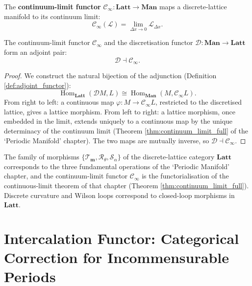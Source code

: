 \begin{definition}\label{def:continuum_limit_functor}
The \textbf{continuum-limit functor} $\mathcal{C}_{\infty}: \mathbf{Latt} \to \mathbf{Man}$ maps a discrete-lattice manifold to its continuum limit:
\[
\mathcal{C}_{\infty}(\mathcal{L}) = \lim_{\Delta x \to 0} \mathcal{L}_{\Delta x}.
\]
\end{definition}

\begin{proposition}\label{prop:continuum_limit_adjunction}
The continuum-limit functor $\mathcal{C}_{\infty}$ and the discretisation functor $\mathcal{D}: \mathbf{Man} \to \mathbf{Latt}$ form an adjoint pair:
\[
\mathcal{D} \dashv \mathcal{C}_{\infty}.
\]
\end{proposition}

\begin{proof}
We construct the natural bijection of the adjunction (Definition \ref{def:adjoint_functor}):
\[
\operatorname{Hom}_{\mathbf{Latt}}(\mathcal{D}M, L) \cong \operatorname{Hom}_{\mathbf{Man}}(M, \mathcal{C}_{\infty}L).
\]
From right to left: a continuous map $\varphi: M \to \mathcal{C}_{\infty}L$, restricted to the discretised lattice, gives a lattice morphism. From left to right: a lattice morphism, once embedded in the limit, extends uniquely to a continuous map by the unique determinacy of the continuum limit (Theorem \ref{thm:continuum_limit_full} of the `Periodic Manifold' chapter). The two maps are mutually inverse, so $\mathcal{D} \dashv \mathcal{C}_{\infty}$.
\end{proof}

\begin{remark}\label{ch13_periodic_manifold_interface_remark}
The family of morphisms $\{\mathcal{T}_{\mathbf{m}}, \mathcal{R}_\theta, \mathcal{S}_\alpha\}$ of the discrete-lattice category $\mathbf{Latt}$ corresponds to the three fundamental operations of the `Periodic Manifold' chapter, and the continuum-limit functor $\mathcal{C}_{\infty}$ is the functorialisation of the continuous-limit theorem of that chapter (Theorem \ref{thm:continuum_limit_full}). Discrete curvature and Wilson loops correspond to closed-loop morphisms in $\mathbf{Latt}$.
\end{remark}

\section{Intercalation Functor: Categorical Correction for Incommensurable Periods}\label{sec:intercalation_functor}

